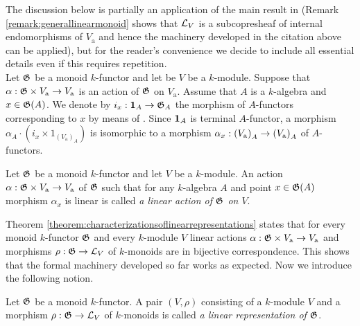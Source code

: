 \noindent
The discussion below is partially an application of the main result in {\cite[section 6]{Presheaves}} (Remark \ref{remark:generallinearmonoid} shows that ${\mathcal L}_V$ is a subcopresheaf of internal endomorphisms of $V_{\mathrm{a}}$ and hence the machinery developed in the citation above can be applied), but for the reader's convenience we decide to include all essential details even if this requires repetition.\\
Let ${\mathfrak G}$ be a monoid $k$-functor and let be $V$ be a $k$-module. Suppose that $\alpha:{\mathfrak G}\times V_{\mathrm{a}}\rightarrow V_{\mathrm{a}}$ is an action of ${\mathfrak G}$ on $V_{\mathrm{a}}$. Assume that $A$ is a $k$-algebra and $x\in {\mathfrak G}(A)$. We denote by $i_x:\mathbf{1}_A\rightarrow {\mathfrak G}_A$ the morphism of $A$-functors corresponding to $x$ by means of {\cite[Fact 2.4]{kfunctors}}. Since $\mathbf{1}_A$ is terminal $A$-functor, a morphism $\alpha_A\cdot \left(i_x \times 1_{\left(V_{\mathrm{a}}\right)_A}\right)$ is isomorphic to a morphism $\alpha_x:\left(V_{\mathrm{a}}\right)_A\rightarrow \left(V_{\mathrm{a}}\right)_A$ of $A$-functors.

\begin{definition}
Let ${\mathfrak G}$ be a monoid $k$-functor and let $V$ be a $k$-module. An action $\alpha:{\mathfrak G}\times V_{\mathrm{a}}\rightarrow V_{\mathrm{a}}$ of ${\mathfrak G}$ such that for any $k$-algebra $A$ and point $x\in {\mathfrak G}(A)$ morphism $\alpha_x$ is linear is called \textit{a linear action of ${\mathfrak G}$ on $V$}.
\end{definition}
\noindent
Theorem \ref{theorem:characterizationsoflinearrepresentations} states that for every monoid $k$-functor ${\mathfrak G}$ and every $k$-module $V$ linear actions $\alpha:{\mathfrak G}\times V_{\mathrm{a}}\rightarrow V_{\mathrm{a}}$ and morphisms $\rho:{\mathfrak G}\rightarrow {\mathcal L}_V$ of $k$-monoids are in bijective correspondence. This shows that the formal machinery developed so far works as expected. Now we introduce the following notion.

\begin{definition}
Let ${\mathfrak G}$ be a monoid $k$-functor. A pair $\left(V,\rho\right)$ consisting of a $k$-module $V$ and a morphism $\rho:{\mathfrak G}\rightarrow {\mathcal L}_V$ of $k$-monoids is called \textit{a linear representation of ${\mathfrak G}$}.
\end{definition}


